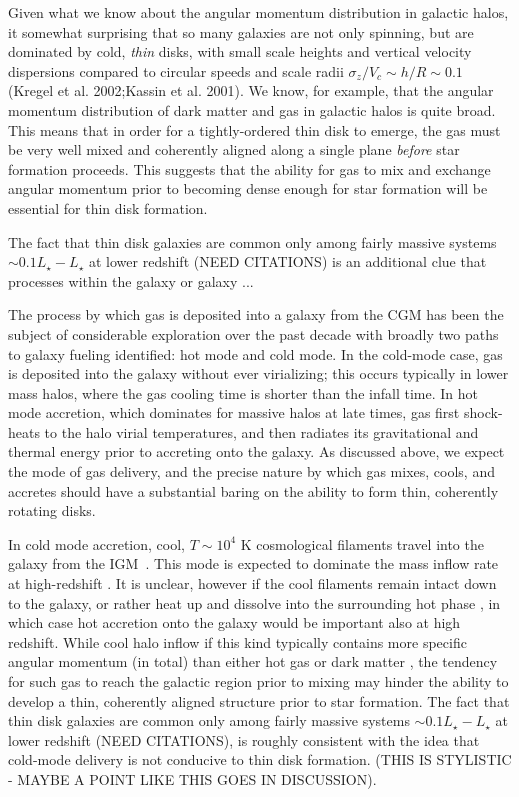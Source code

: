 \documentclass[fleqn,usenatbib]{mnras}
\begin{document}
Given what we know about the angular momentum distribution in galactic halos, it somewhat surprising that so many galaxies are not only spinning, but are dominated by cold, {\em thin} disks, with small scale heights and vertical velocity dispersions compared to circular speeds and scale radii $\sigma_z/V_c \sim h/R \sim 0.1$ (Kregel et al. 2002;Kassin et al. 2001).  We know, for example, that the angular momentum distribution of dark matter \citep{B01} and gas \citep{Stewart13,DeFelippis2020} in galactic halos is quite broad.  This means that in order for a tightly-ordered thin disk to emerge, the gas must be very well mixed and coherently aligned along a single plane {\em before} star formation proceeds.  This suggests that the ability for gas to mix and exchange angular momentum prior to becoming dense enough for star formation will be essential for thin disk formation. 

The fact that thin disk galaxies are common only among fairly massive systems $\sim 0.1 L_\star - L_\star$ at lower redshift (NEED CITATIONS) is an additional clue that processes within the galaxy or galaxy ...
 
The process by which gas is deposited into a galaxy from the CGM has been the subject of considerable exploration over the past decade \citep[e.g.][]{Keres2005, Dekel2006, Keres2009, Martin2019a} with broadly two paths to galaxy fueling identified: hot mode and cold mode.   In the cold-mode case, gas is deposited into the galaxy without ever virializing; this occurs typically in lower mass halos, where the gas cooling time is shorter than the infall time.
In hot mode accretion, which dominates for massive halos at late times, gas first shock-heats to the halo virial temperatures, and then radiates its gravitational and thermal energy prior to accreting onto the galaxy. As discussed above, we expect the mode of gas delivery, and the precise nature by which gas mixes, cools, and accretes should have a substantial baring on the ability to form thin, coherently rotating disks.  

In cold mode accretion, cool, $T \sim 10^4$ K cosmological filaments travel into the galaxy from the IGM~\cite[e.g.][]{Keres2005, Dekel2006, Keres2009, Martin2019a}. This mode is expected to dominate the mass inflow rate at high-redshift \citep[$z\gtrsim2$, e.g.][]{Keres2009a, Dekel2009, Huscher2020}. It is unclear, however if the cool filaments remain intact down to the galaxy, or rather heat up and dissolve into the surrounding hot phase \citep{Nelson2016, Mandelker+}, in which case hot accretion onto the galaxy would be important also at high redshift. While cool halo inflow if this kind typically contains more specific angular momentum (in total) than either hot gas or dark matter \citep{Stewart2017}, the tendency for such gas to reach the galactic region prior to mixing may hinder the ability to develop a thin, coherently aligned structure prior to star formation. The fact that thin disk galaxies are common only among fairly massive systems $\sim 0.1 L_\star - L_\star$ at lower redshift (NEED CITATIONS), is roughly consistent with the idea that cold-mode delivery is not conducive to thin disk formation. (THIS IS STYLISTIC - MAYBE A POINT LIKE THIS GOES IN DISCUSSION).
\end{document}
